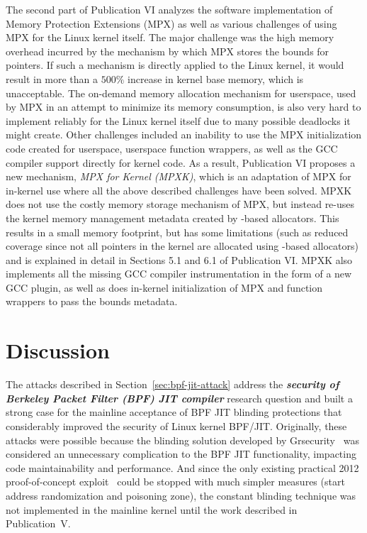 The second part of Publication VI analyzes the software implementation of \intel Memory Protection Extensions (MPX) as well as various challenges of using MPX for the Linux kernel itself. The major challenge was the high memory overhead incurred by the mechanism by which MPX stores the bounds for pointers. If such a mechanism is directly applied to the Linux kernel, it would result in more than a $500\%$ increase in kernel base memory, which is unacceptable. The on-demand memory allocation mechanism for userspace, used by MPX in an attempt to minimize its memory consumption, is also very hard to implement reliably for the Linux kernel itself due to many possible deadlocks it might create. Other challenges included an inability to use the MPX initialization code created for userspace, userspace function wrappers, as well as the GCC compiler support directly for kernel code.
As a result, Publication VI proposes a new mechanism, \emph{MPX for Kernel (MPXK)}, which is an adaptation of \intel MPX for in-kernel use where all the above described challenges have been solved. MPXK does not use the costly memory storage mechanism of MPX, but instead re-uses the kernel memory management metadata created by -based allocators. This results in a small memory footprint, but has some limitations (such as reduced coverage since not all pointers in the kernel are allocated using -based allocators) and is explained in detail in Sections 5.1 and 6.1 of Publication VI. MPXK also implements all the missing GCC compiler instrumentation in the form of a new GCC plugin, as well as does in-kernel initialization of MPX and function wrappers to pass the bounds metadata. 

\section{Discussion}


The attacks described in Section~\ref{sec:bpf-jit-attack} address the \textit{\textbf{security of Berkeley Packet Filter (BPF) JIT compiler}} research question and built a strong case for the mainline acceptance of BPF JIT blinding protections that considerably improved the security of Linux kernel BPF/JIT. Originally, these attacks were possible because the blinding solution developed by Grsecurity~\cite{grsecurity} was considered an unnecessary complication to the BPF JIT functionality, impacting code maintainability and performance. And since the only existing practical 2012 proof-of-concept exploit~\cite{mcallister2012attacking} could be stopped with much simpler measures (start address randomization and poisoning zone), the constant blinding technique was not implemented in the mainline kernel until the work described in Publication~V. 

